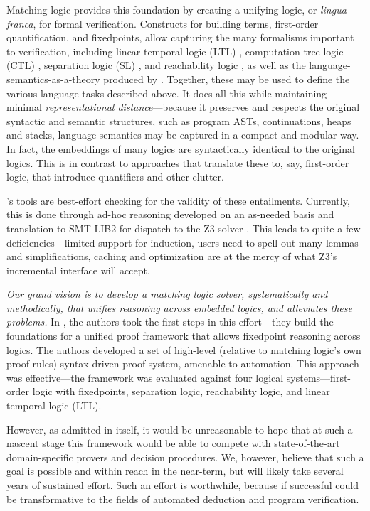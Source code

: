 Matching logic provides this foundation by creating a unifying logic, or \emph{lingua franca}, for formal verification.
Constructs for building terms, first-order quantification, and fixedpoints,
allow capturing the many formalisms important to verification,
including linear temporal logic (LTL) \cite{ltl}, computation tree logic (CTL) \cite{ctl}, separation logic (SL) \cite{separation-logic}, and
reachability logic \cite{matchinglogiclmcs,matching-mu-logic},
as well as the language-semantics-as-a-theory produced by \K{}.
Together, these may be used to define the various language tasks described above.
It does all this while maintaining minimal \emph{representational distance}---because
it preserves and respects the original syntactic and semantic structures,
such as program ASTs, continuations, heaps and stacks, language semantics may be captured in a compact and modular way.
In fact, the embeddings of many logics are syntactically identical to the original logics.
This is in contrast to approaches that translate these to, say, first-order logic,
that introduce quantifiers and other clutter.

\K{}'s tools are best-effort checking for the validity of these entailments.
Currently, this is done through ad-hoc reasoning developed on an as-needed basis
and translation to SMT-LIB2 \cite{smtlib} for dispatch to the Z3 solver \cite{z3}.
This leads to quite a few deficiencies---limited support for induction,
users need to spell out many lemmas and simplifications,
caching and optimization are at the mercy of what Z3's incremental interface will accept.
\newline

\emph{Our grand vision is to develop a matching logic solver, systematically and methodically,
that unifies reasoning across embedded logics, and alleviates these problems.}
In \cite{towards-a-unified-framework}, the authors took the first steps in this
effort---they build the foundations for a unified proof framework that allows
fixedpoint reasoning across logics.
The authors developed a set of
high-level (relative to matching logic's own proof rules)
syntax-driven proof system, amenable to automation.
This approach was effective---the framework was evaluated against four logical
systems---first-order logic with fixedpoints, separation logic, reachability
logic, and linear temporal logic (LTL).

However, as admitted in \cite{towards-a-unified-framework} itself, it would be unreasonable
to hope that at such a nascent stage this framework would be able to compete with
state-of-the-art domain-specific provers and decision procedures.
We, however, believe that such a goal is possible and within reach in the near-term, but will
likely take several years of sustained effort.
Such an effort is worthwhile, because if successful could be transformative to the fields
of automated deduction and program verification.

